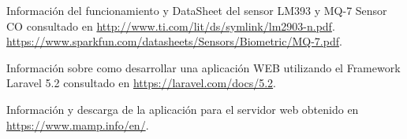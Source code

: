 \begin{thebibliography}{10}
Información del funcionamiento y DataSheet del sensor LM393 y MQ-7 Sensor CO
\newblock consultado en 
\url{http://www.ti.com/lit/ds/symlink/lm2903-n.pdf}.
\url{https://www.sparkfun.com/datasheets/Sensors/Biometric/MQ-7.pdf}.

Información sobre como desarrollar una aplicación WEB utilizando el Framework Laravel 5.2
\newblock consultado en 
\url{https://laravel.com/docs/5.2}.

Información y descarga de la aplicación para el servidor web
\newblock obtenido en 
\url{https://www.mamp.info/en/}.




\end{thebibliography}